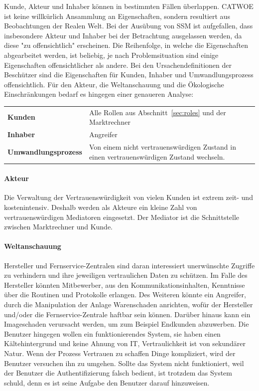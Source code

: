 \documentclass[11pt,a4paper]{report}
\begin{document}
Kunde, Akteur und Inhaber können in bestimmten Fällen überlappen. CATWOE ist keine willkürlich Ansammlung an Eigenschaften, sondern resultiert aus Beobachtungen der Realen Welt. Bei der Ausübung von SSM ist aufgefallen, dass insbesondere Akteur und Inhaber bei der Betrachtung ausgelassen werden, da diese "zu offensichtlich" erscheinen\cite{gutmann7}. Die Reihenfolge, in welche die Eigenschaften abgearbeitet werden, ist beliebig, je nach Problemsituation sind einige Eigenschaften offensichtlicher als andere. Bei den Ursachendefinitionen der Beschützer sind die Eigenschaften für Kunden, Inhaber und Umwandlungsprozess offensichtlich. Für den Akteur, die Weltanschauung und die Ökologische Einschränkungen bedarf es hingegen einer genaueren Analyse:

\setlength{\tabcolsep}{12pt}
\renewcommand{\arraystretch}{1.5}
\begin{table}[h] %
\begin{tabularx}{\linewidth}{@{}lX@{}}
\textbf{Kunden} & Alle Rollen aus Abschnitt~\ref{sec:roles} und der Marktrechner\\
\textbf{Inhaber} & Angreifer\\
\textbf{Umwandlungsprozess} & 
Von einem nicht vertrauenswürdigen Zustand in einen vertrauenswürdigen Zustand wechseln.\\
\end{tabularx}
\end{table}

\paragraph{Akteur} Die Verwaltung der Vertrauenswürdigkeit von vielen Kunden ist extrem zeit- und kostenintensiv. Deshalb werden als Akteure ein kleine Zahl von vertrauenswürdigen Mediatoren eingesetzt. Der Mediator ist die Schnittstelle zwischen Marktrechner und Kunde.

\paragraph{Weltanschauung} Hersteller und Fernservice-Zentralen sind daran interessiert unerwünschte Zugriffe zu verhindern und ihre jeweiligen vertraulichen Daten zu schützen. Im Falle des Hersteller könnten Mitbewerber, aus den Kommunikationsinhalten, Kenntnisse über die Routinen und Protokolle erlangen. Des Weiteren könnte ein Angreifer, durch die Manipulation der Anlage Warenschaden anrichten, wofür der Hersteller und/oder die Fernservice-Zentrale haftbar sein können. Darüber hinaus kann ein Imageschaden verursacht werden, um zum Beispiel Endkunden abzuwerben. Die Benutzer hingegen wollen ein funktionierendes System, sie haben einen Kältehintergrund und keine Ahnung von IT, Vertraulichkeit ist von sekundärer Natur. Wenn der Prozess Vertrauen zu schaffen Dinge kompliziert, wird der Benutzer versuchen ihn zu umgehen. Sollte das System nicht funktioniert, weil der Benutzer die Authentifizierung falsch bedient, ist trotzdem das System schuld, denn es ist seine Aufgabe den Benutzer darauf hinzuweisen.
\end{document}
